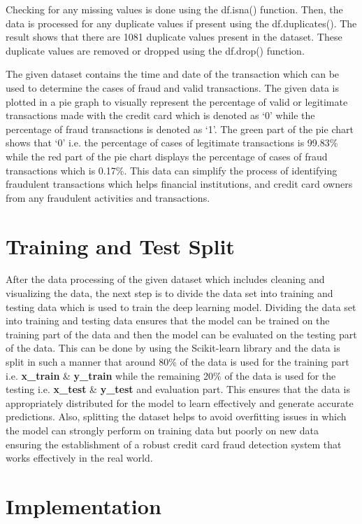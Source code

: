 Checking for any missing values is done using the df.isna() function. Then, the data is processed for any duplicate values if present using the df.duplicates(). The result shows that there are 1081 duplicate values present in the dataset. These duplicate values are removed or dropped using the df.drop() function.

The given dataset contains the time and date of the transaction which can be used to determine the cases of fraud and valid transactions. The given data is plotted in a pie graph to visually represent the percentage of valid or legitimate transactions made with the credit card which is denoted as ‘0’ while the percentage of fraud transactions is denoted as ‘1’. The green part of the pie chart shows that ‘0’ i.e. the percentage of cases of legitimate transactions is 99.83\% while the red part of the pie chart displays the percentage of cases of fraud transactions which is 0.17\%. This data can simplify the process of identifying fraudulent transactions which helps financial institutions, and credit card owners from any fraudulent activities and transactions.


 \section{Training and Test Split}
 After the data processing of the given dataset which includes cleaning and visualizing the data, the next step is to divide the data set into training and testing data which is used to train the deep learning model. Dividing the data set into training and testing data ensures that the model can be trained on the training part of the data and then the model can be evaluated on the testing part of the data. This can be done by using the Scikit-learn library and the data is split in such a manner that around 80\% of the data is used for the training part i.e.\textbf{ x\_train }\& \textbf{y\_train }while the remaining 20\% of the data is used for the testing i.e. \textbf{x\_test }\&\textbf{ y\_test} and evaluation part. This ensures that the data is appropriately distributed for the model to learn effectively and generate accurate predictions. Also, splitting the dataset helps to avoid overfitting issues in which the model can strongly perform on training data but poorly on new data ensuring the establishment of a robust credit card fraud detection system that works effectively in the real world.

 



\section{Implementation}
